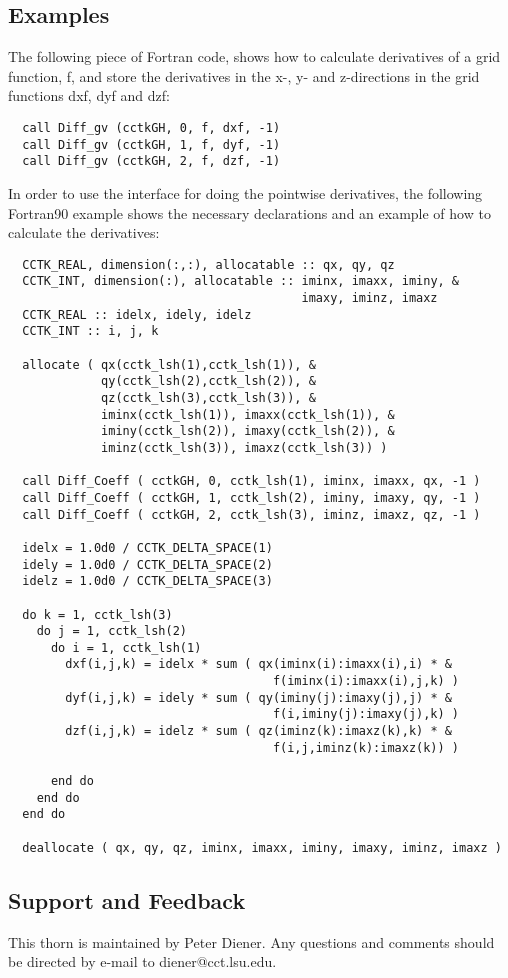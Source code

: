 \subsection{Examples}
The following piece of Fortran code, shows how to calculate derivatives of
a grid function, f, and store the derivatives in the x-, y- and z-directions
in the grid functions  dxf, dyf and dzf:
\begin{verbatim}
  call Diff_gv (cctkGH, 0, f, dxf, -1)
  call Diff_gv (cctkGH, 1, f, dyf, -1)
  call Diff_gv (cctkGH, 2, f, dzf, -1)
\end{verbatim}
In order to use the interface for doing the pointwise derivatives, the
following Fortran90 example shows the necessary declarations and an example
of how to calculate the derivatives:
\begin{verbatim}
  CCTK_REAL, dimension(:,:), allocatable :: qx, qy, qz
  CCTK_INT, dimension(:), allocatable :: iminx, imaxx, iminy, &
                                         imaxy, iminz, imaxz
  CCTK_REAL :: idelx, idely, idelz
  CCTK_INT :: i, j, k

  allocate ( qx(cctk_lsh(1),cctk_lsh(1)), &
             qy(cctk_lsh(2),cctk_lsh(2)), &
             qz(cctk_lsh(3),cctk_lsh(3)), &
             iminx(cctk_lsh(1)), imaxx(cctk_lsh(1)), &
             iminy(cctk_lsh(2)), imaxy(cctk_lsh(2)), &
             iminz(cctk_lsh(3)), imaxz(cctk_lsh(3)) )

  call Diff_Coeff ( cctkGH, 0, cctk_lsh(1), iminx, imaxx, qx, -1 )
  call Diff_Coeff ( cctkGH, 1, cctk_lsh(2), iminy, imaxy, qy, -1 )
  call Diff_Coeff ( cctkGH, 2, cctk_lsh(3), iminz, imaxz, qz, -1 )

  idelx = 1.0d0 / CCTK_DELTA_SPACE(1)
  idely = 1.0d0 / CCTK_DELTA_SPACE(2)
  idelz = 1.0d0 / CCTK_DELTA_SPACE(3)

  do k = 1, cctk_lsh(3)
    do j = 1, cctk_lsh(2)
      do i = 1, cctk_lsh(1)
        dxf(i,j,k) = idelx * sum ( qx(iminx(i):imaxx(i),i) * &
                                     f(iminx(i):imaxx(i),j,k) )
        dyf(i,j,k) = idely * sum ( qy(iminy(j):imaxy(j),j) * &
                                     f(i,iminy(j):imaxy(j),k) )
        dzf(i,j,k) = idelz * sum ( qz(iminz(k):imaxz(k),k) * &
                                     f(i,j,iminz(k):imaxz(k)) )

      end do
    end do
  end do

  deallocate ( qx, qy, qz, iminx, imaxx, iminy, imaxy, iminz, imaxz )
\end{verbatim}
\subsection{Support and Feedback}
This thorn is maintained by Peter Diener. Any questions and comments should
be directed by e-mail to diener@cct.lsu.edu.

